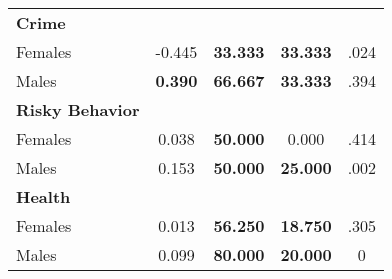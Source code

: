 \begin{tabular}{l c c c c}
\midrule
\textbf{Crime} & & & & \\
\quad Females &     -0.445 & \textbf{   33.333} & \textbf{   33.333} & .024 \\
\quad Males &  \textbf{    0.390} & \textbf{   66.667} & \textbf{   33.333} & .394 \\
\midrule
\textbf{Risky Behavior} & & & & \\
\quad Females &      0.038 & \textbf{   50.000} &     0.000 & .414 \\
\quad Males &      0.153 & \textbf{   50.000} & \textbf{   25.000} & .002 \\
\midrule
\textbf{Health} & & & & \\
\quad Females &      0.013 & \textbf{   56.250} & \textbf{   18.750} & .305 \\
\quad Males &      0.099 & \textbf{   80.000} & \textbf{   20.000} & 0 \\
\bottomrule
\end{tabular}
